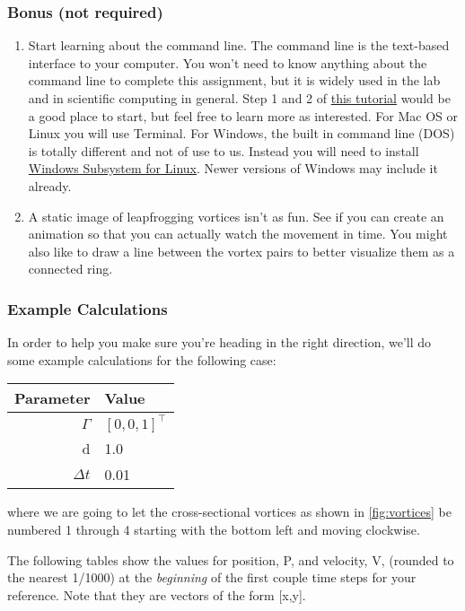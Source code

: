 \documentclass{article}
\begin{document}
\subsubsection*{Bonus (not required)}
\begin{enumerate}
    \item Start learning about the command line.  The command line is the text-based interface to your computer.  You won't need to know anything about the command line to complete this assignment, but it is widely used in the lab and in scientific computing in general.  Step 1 and 2 of \href{https://www.codecademy.com/learn/learn-the-command-line}{this tutorial} would be a good place to start, but feel free to learn more as interested.  For Mac OS or Linux you will use Terminal.  For Windows, the built in command line (DOS) is totally different and not of use to us. Instead you will need to install \href{https://docs.microsoft.com/en-us/windows/wsl/about}{Windows Subsystem for Linux}.  Newer versions of Windows may include it already.
    \item A static image of leapfrogging vortices isn't as fun.  See if you can create an animation so that you can actually watch the movement in time.  You might also like to draw a line between the vortex pairs to better visualize them as a connected ring.
\end{enumerate}

\subsubsection*{Example Calculations}

In order to help you make sure you're heading in the right direction, we'll do some example calculations for the following case:

\renewcommand{\arraystretch}{1.5}
\begin{tabular}{r | l}
	Parameter & Value \\
	\hline
	$\Gamma$ & $[0,0,1]^\top$ \\
	d & 1.0 \\
	$\Delta t$ & 0.01 
\end{tabular}

\noindent where we are going to let the cross-sectional vortices as shown in \cref{fig:vortices} be numbered 1 through 4 starting with the bottom left and moving clockwise.

The following tables show the values for position, P, and velocity, V, (rounded to the nearest 1/1000) at the \textit{beginning} of the first couple time steps for your reference. Note that they are vectors of the form [x,y].
\end{document}
